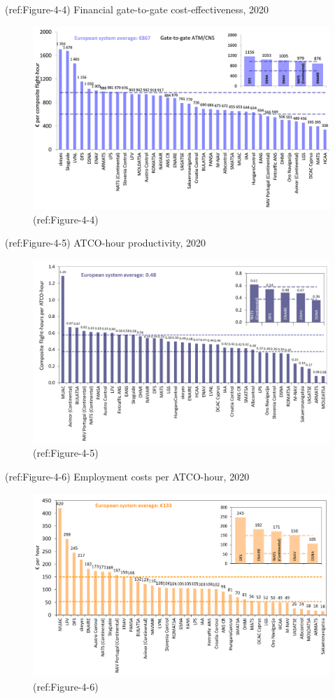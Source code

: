 \documentclass[
]{book}
\begin{document}
(ref:Figure-4-4) Financial gate-to-gate cost-effectiveness, 2020

\begin{figure}

{\centering \includegraphics[width=0.8\linewidth]{figures/Figure-4-4} 

}

\caption{(ref:Figure-4-4)}\label{fig:Figure-4-4}
\end{figure}

(ref:Figure-4-5) ATCO-hour productivity, 2020

\begin{figure}

{\centering \includegraphics[width=0.8\linewidth]{figures/Figure-4-5} 

}

\caption{(ref:Figure-4-5)}\label{fig:Figure-4-5}
\end{figure}

(ref:Figure-4-6) Employment costs per ATCO-hour, 2020

\begin{figure}

{\centering \includegraphics[width=0.8\linewidth]{figures/Figure-4-6} 

}

\caption{(ref:Figure-4-6)}\label{fig:Figure-4-6}
\end{figure}
\end{document}
